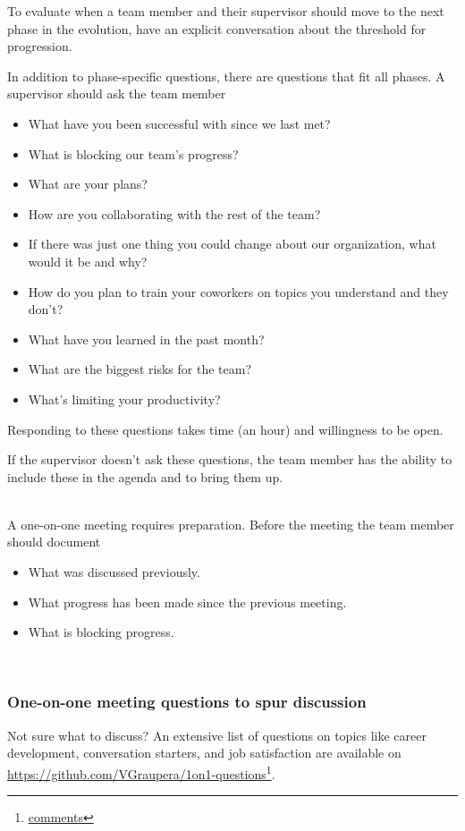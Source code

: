 To evaluate when a team member and their supervisor should move to the next phase in the evolution, have an explicit conversation about the threshold for progression.


In addition to phase-specific questions, there are questions that fit all phases. A supervisor should ask the team member
\begin{itemize}
    \item What have you been successful with since we last met?
    \item What is blocking our team's progress?
    \item What are your plans?
    \item How are you collaborating with the rest of the team?
    \item If there was just one thing you could change about our organization, what would it be and why?
    \item How do you plan to train your coworkers on topics you understand and they don't?
    \item What have you learned in the past month?
    \item What are the biggest risks for the team?
    \item What's limiting your productivity?
\end{itemize}
Responding to these questions takes time (an hour) and willingness to be open. 

If the supervisor doesn't ask these questions, the team member has the ability to include these in the agenda and to bring them up. 


\ \\

A one-on-one meeting requires preparation. Before the meeting the team member should document
\begin{itemize}
    \item What was discussed previously.
    \item What progress has been made since the previous meeting.
    \item What is blocking progress.
\end{itemize}




\ \\

\subsubsection*{One-on-one meeting questions to spur discussion}

Not sure what to discuss? An extensive list of questions on topics like career development, conversation starters, and job satisfaction are available on \href{https://github.com/VGraupera/1on1-questions}{https://github.com/VGraupera/1on1-questions}\footnote{\href{https://news.ycombinator.com/item?id=22341138}{comments}}.